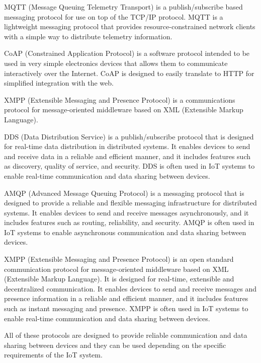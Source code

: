 \documentclass{article}
\begin{document}
MQTT (Message Queuing Telemetry Transport) is a publish/subscribe based messaging protocol for use on top of the TCP/IP protocol. MQTT is a lightweight messaging protocol that provides resource-constrained network clients with a simple way to distribute telemetry information.

CoAP (Constrained Application Protocol) is a software protocol intended to be used in very simple electronics devices that allows them to communicate interactively over the Internet. CoAP is designed to easily translate to HTTP for simplified integration with the web.

XMPP (Extensible Messaging and Presence Protocol) is a communications protocol for message-oriented middleware based on XML (Extensible Markup Language).

DDS (Data Distribution Service) is a publish/subscribe protocol that is designed for real-time data distribution in distributed systems. It enables devices to send and receive data in a reliable and efficient manner, and it includes features such as discovery, quality of service, and security. DDS is often used in IoT systems to enable real-time communication and data sharing between devices.

AMQP (Advanced Message Queuing Protocol) is a messaging protocol that is designed to provide a reliable and flexible messaging infrastructure for distributed systems. It enables devices to send and receive messages asynchronously, and it includes features such as routing, reliability, and security. AMQP is often used in IoT systems to enable asynchronous communication and data sharing between devices.

XMPP (Extensible Messaging and Presence Protocol) is an open standard communication protocol for message-oriented middleware based on XML (Extensible Markup Language). It is designed for real-time, extensible and decentralized communication. It enables devices to send and receive messages and presence information in a reliable and efficient manner, and it includes features such as instant messaging and presence. XMPP is often used in IoT systems to enable real-time communication and data sharing between devices.

All of these protocols are designed to provide reliable communication and data sharing between devices and they can be used depending on the specific requirements of the IoT system. 
\end{document}
